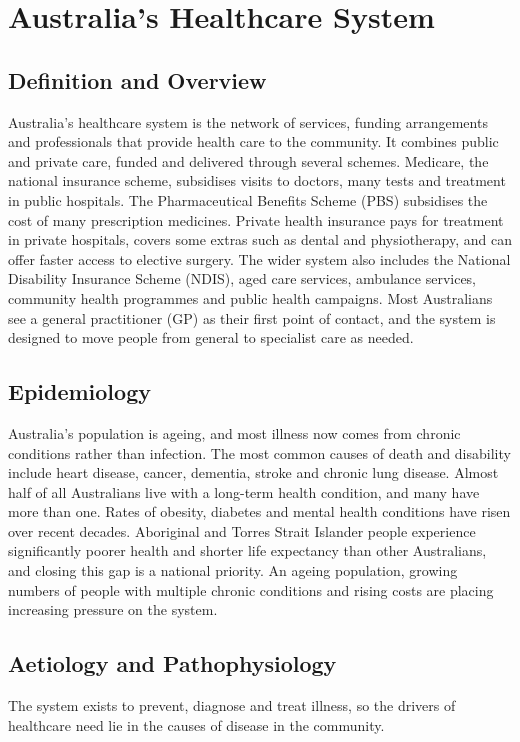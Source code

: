 \chapter{Australia's Healthcare System}

\section*{Definition and Overview}
Australia's healthcare system is the network of services, funding arrangements and professionals that provide health care to the community. It combines public and private care, funded and delivered through several schemes. Medicare, the national insurance scheme, subsidises visits to doctors, many tests and treatment in public hospitals. The Pharmaceutical Benefits Scheme (PBS) subsidises the cost of many prescription medicines. Private health insurance pays for treatment in private hospitals, covers some extras such as dental and physiotherapy, and can offer faster access to elective surgery. The wider system also includes the National Disability Insurance Scheme (NDIS), aged care services, ambulance services, community health programmes and public health campaigns. Most Australians see a general practitioner (GP) as their first point of contact, and the system is designed to move people from general to specialist care as needed.

\section*{Epidemiology}
Australia's population is ageing, and most illness now comes from chronic conditions rather than infection. The most common causes of death and disability include heart disease, cancer, dementia, stroke and chronic lung disease. Almost half of all Australians live with a long-term health condition, and many have more than one. Rates of obesity, diabetes and mental health conditions have risen over recent decades. Aboriginal and Torres Strait Islander people experience significantly poorer health and shorter life expectancy than other Australians, and closing this gap is a national priority. An ageing population, growing numbers of people with multiple chronic conditions and rising costs are placing increasing pressure on the system.

\section*{Aetiology and Pathophysiology}
The system exists to prevent, diagnose and treat illness, so the drivers of healthcare need lie in the causes of disease in the community.

